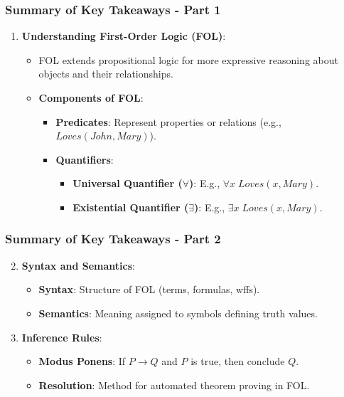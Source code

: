 \documentclass[aspectratio=169]{beamer}
\begin{document}
\begin{frame}[fragile]
    \frametitle{Summary of Key Takeaways - Part 1}
    \begin{enumerate}
        \item \textbf{Understanding First-Order Logic (FOL)}: 
        \begin{itemize}
            \item FOL extends propositional logic for more expressive reasoning about objects and their relationships.
            \item \textbf{Components of FOL}:
            \begin{itemize}
                \item \textbf{Predicates}: Represent properties or relations (e.g., $Loves(John, Mary)$).
                \item \textbf{Quantifiers}:
                \begin{itemize}
                    \item \textbf{Universal Quantifier ($\forall$)}: E.g., $\forall x \; Loves(x, Mary)$.
                    \item \textbf{Existential Quantifier ($\exists$)}: E.g., $\exists x \; Loves(x, Mary)$.
                \end{itemize}
            \end{itemize}
        \end{itemize}
    \end{enumerate}
\end{frame}

\begin{frame}[fragile]
    \frametitle{Summary of Key Takeaways - Part 2}
    \begin{enumerate}
        \setcounter{enumi}{1} %
        \item \textbf{Syntax and Semantics}:
        \begin{itemize}
            \item \textbf{Syntax}: Structure of FOL (terms, formulas, wffs).
            \item \textbf{Semantics}: Meaning assigned to symbols defining truth values.
        \end{itemize}
        
        \item \textbf{Inference Rules}:
        \begin{itemize}
            \item \textbf{Modus Ponens}: If $P \rightarrow Q$ and $P$ is true, then conclude $Q$.
            \item \textbf{Resolution}: Method for automated theorem proving in FOL.
        \end{itemize}
    \end{enumerate}
\end{frame}
\end{document}
